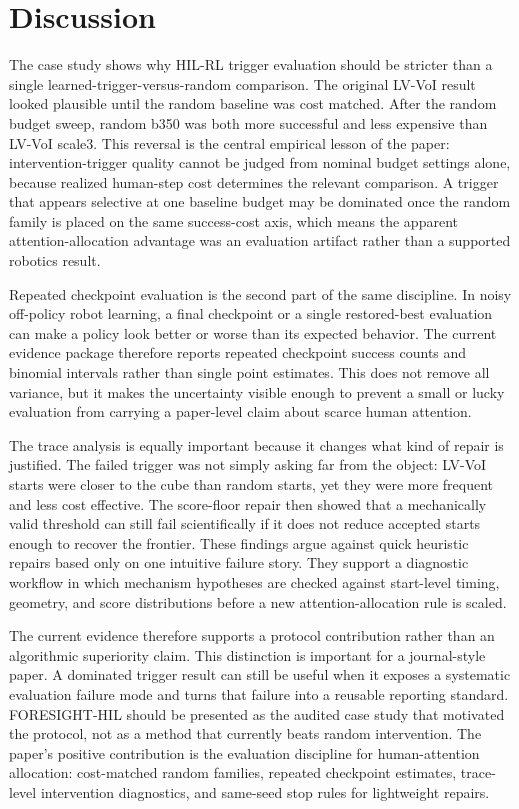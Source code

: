 \section{Discussion}

The case study shows why HIL-RL trigger evaluation should be stricter than a single learned-trigger-versus-random comparison. The original LV-VoI result looked plausible until the random baseline was cost matched. After the random budget sweep, random b350 was both more successful and less expensive than LV-VoI scale3. This reversal is the central empirical lesson of the paper: intervention-trigger quality cannot be judged from nominal budget settings alone, because realized human-step cost determines the relevant comparison. A trigger that appears selective at one baseline budget may be dominated once the random family is placed on the same success-cost axis, which means the apparent attention-allocation advantage was an evaluation artifact rather than a supported robotics result.

Repeated checkpoint evaluation is the second part of the same discipline. In noisy off-policy robot learning, a final checkpoint or a single restored-best evaluation can make a policy look better or worse than its expected behavior. The current evidence package therefore reports repeated checkpoint success counts and binomial intervals rather than single point estimates. This does not remove all variance, but it makes the uncertainty visible enough to prevent a small or lucky evaluation from carrying a paper-level claim about scarce human attention.

The trace analysis is equally important because it changes what kind of repair is justified. The failed trigger was not simply asking far from the object: LV-VoI starts were closer to the cube than random starts, yet they were more frequent and less cost effective. The score-floor repair then showed that a mechanically valid threshold can still fail scientifically if it does not reduce accepted starts enough to recover the frontier. These findings argue against quick heuristic repairs based only on one intuitive failure story. They support a diagnostic workflow in which mechanism hypotheses are checked against start-level timing, geometry, and score distributions before a new attention-allocation rule is scaled.

The current evidence therefore supports a protocol contribution rather than an algorithmic superiority claim. This distinction is important for a journal-style paper. A dominated trigger result can still be useful when it exposes a systematic evaluation failure mode and turns that failure into a reusable reporting standard. FORESIGHT-HIL should be presented as the audited case study that motivated the protocol, not as a method that currently beats random intervention. The paper's positive contribution is the evaluation discipline for human-attention allocation: cost-matched random families, repeated checkpoint estimates, trace-level intervention diagnostics, and same-seed stop rules for lightweight repairs.

